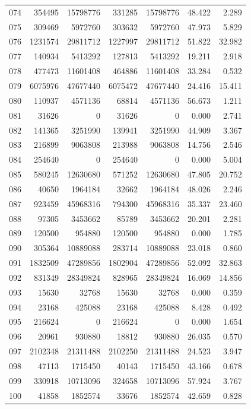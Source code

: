\begin{longtable}{lrrrrrr}
074 & 354495 & 15798776 & 331285 & 15798776 & 48.422 & 2.289\\
075 & 309469 & 5972760 & 303632 & 5972760 & 47.973 & 5.829\\
076 & 1231574 & 29811712 & 1227997 & 29811712 & 51.822 & 32.982\\
077 & 140934 & 5413292 & 127813 & 5413292 & 19.211 & 2.918\\
078 & 477473 & 11601408 & 464886 & 11601408 & 33.284 & 0.532\\
079 & 6075976 & 47677440 & 6075472 & 47677440 & 24.416 & 15.411\\
080 & 110937 & 4571136 & 68814 & 4571136 & 56.673 & 1.211\\
081 & 31626 & 0 & 31626 & 0 & 0.000 & 2.741\\
082 & 141365 & 3251990 & 139941 & 3251990 & 44.909 & 3.367\\
083 & 216899 & 9063808 & 213988 & 9063808 & 14.756 & 2.546\\
084 & 254640 & 0 & 254640 & 0 & 0.000 & 5.004\\
085 & 580245 & 12630680 & 571252 & 12630680 & 47.805 & 20.752\\
086 & 40650 & 1964184 & 32662 & 1964184 & 48.026 & 2.246\\
087 & 923459 & 45968316 & 794300 & 45968316 & 35.337 & 23.460\\
088 & 97305 & 3453662 & 85789 & 3453662 & 20.201 & 2.281\\
089 & 120500 & 954880 & 120500 & 954880 & 0.000 & 1.785\\
090 & 305364 & 10889088 & 283714 & 10889088 & 23.018 & 0.860\\
091 & 1832509 & 47289856 & 1802904 & 47289856 & 52.092 & 32.863\\
092 & 831349 & 28349824 & 828965 & 28349824 & 16.069 & 14.856\\
093 & 15630 & 32768 & 15630 & 32768 & 0.000 & 0.359\\
094 & 23168 & 425088 & 23168 & 425088 & 8.428 & 0.492\\
095 & 216624 & 0 & 216624 & 0 & 0.000 & 1.654\\
096 & 20961 & 930880 & 18812 & 930880 & 26.035 & 0.570\\
097 & 2102348 & 21311488 & 2102250 & 21311488 & 24.523 & 3.947\\
098 & 47113 & 1715450 & 40143 & 1715450 & 43.166 & 0.678\\
099 & 330918 & 10713096 & 324658 & 10713096 & 57.924 & 3.767\\
100 & 41858 & 1852574 & 33676 & 1852574 & 42.659 & 0.828\\
\end{longtable}
